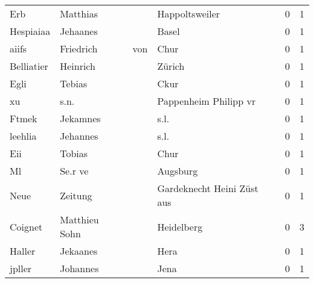 \begin{center}
\begin{tiny}
\begin{longtabu}{llllrr}
                      Erb &                           Matthias &             &                              Happoltsweiler &          0 &         1 \\
                Hespiaiaa &                           Jehaanes &             &                                       Basel &          0 &         1 \\
                    aiifs &                          Friedrich &         von &                                        Chur &          0 &         1 \\
               Belliatier &                           Heinrich &             &                                      Zürich &          0 &         1 \\
                     Egli &                             Tebias &             &                                        Ckur &          0 &         1 \\
                       xu &                               s.n. &             &                       Pappenheim Philipp vr &          0 &         1 \\
                    Ftmek &                           Jekamnes &             &                                        s.l. &          0 &         1 \\
                  leehlia &                           Jehannes &             &                                        s.l. &          0 &         1 \\
                      Eii &                             Tobias &             &                                        Chur &          0 &         1 \\
                       Ml &                            Se.r ve &             &                                    Augsburg &          0 &         1 \\
                     Neue &                            Zeitung &             &                  Gardeknecht Heini Züst aus &          0 &         1 \\
                  Coignet &                      Matthieu Sohn &             &                                  Heidelberg &          0 &         3 \\
                   Haller &                           Jekaanes &             &                                        Hera &          0 &         1 \\
                   jpller &                           Johannes &             &                                        Jena &          0 &         1 \\

\end{longtabu}
\end{tiny}
\end{center}
